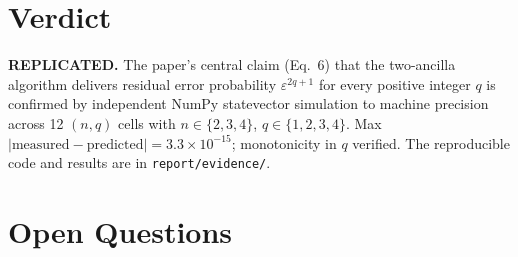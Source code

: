 \documentclass[11pt]{article}
\begin{document}
\section{Verdict}

\textbf{REPLICATED.} The paper's central claim (Eq.~6) that the
two-ancilla algorithm delivers residual error probability
\(\varepsilon^{2q+1}\) for every positive integer \(q\) is confirmed by
independent NumPy statevector simulation to machine precision across
12 \((n,q)\) cells with \(n\in\{2,3,4\}\), \(q\in\{1,2,3,4\}\). Max
\(|\text{measured}-\text{predicted}|=3.3\times 10^{-15}\); monotonicity
in \(q\) verified. The reproducible code and results are in
\texttt{report/evidence/}.

\section*{Open Questions}


\end{document}
